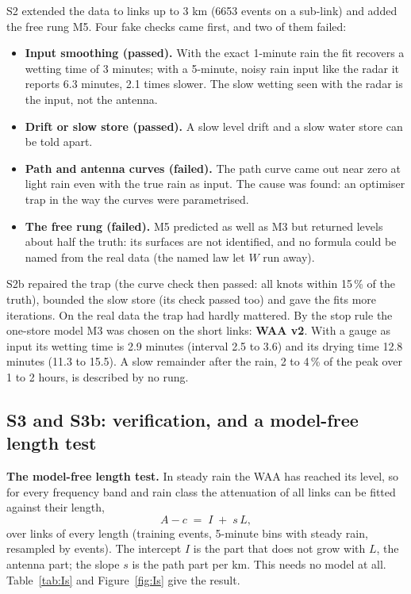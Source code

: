 \documentclass[11pt,a4paper]{article}
\begin{document}
S2 extended the data to links up to 3 km (6653 events on a sub-link) and added the free rung M5. Four fake checks
came first, and two of them failed:
\begin{itemize}
\item \textbf{Input smoothing (passed).} With the exact 1-minute rain the fit recovers a wetting time of 3 minutes;
with a 5-minute, noisy rain input like the radar it reports 6.3 minutes, 2.1 times slower. The slow wetting seen with
the radar is the input, not the antenna.
\item \textbf{Drift or slow store (passed).} A slow level drift and a slow water store can be told apart.
\item \textbf{Path and antenna curves (failed).} The path curve came out near zero at light rain even with the true
rain as input. The cause was found: an optimiser trap in the way the curves were parametrised.
\item \textbf{The free rung (failed).} M5 predicted as well as M3 but returned levels about half the truth: its
surfaces are not identified, and no formula could be named from the real data (the named law let $W$ run away).
\end{itemize}
S2b repaired the trap (the curve check then passed: all knots within 15\,\% of the truth), bounded the slow store
(its check passed too) and gave the fits more iterations. On the real data the trap had hardly mattered. By the stop
rule the one-store model M3 was chosen on the short links: \textbf{WAA v2}. With a gauge as input its wetting time is
2.9 minutes (interval 2.5 to 3.6) and its drying time 12.8 minutes (11.3 to 15.5). A slow remainder after the rain,
2 to 4\,\% of the peak over 1 to 2 hours, is described by no rung.

\subsection{S3 and S3b: verification, and a model-free length test}
\label{sec:s3}

\textbf{The model-free length test.} In steady rain the WAA has reached its level, so for every frequency band and
rain class the attenuation of all links can be fitted against their length,
\begin{equation}
A - c \;=\; I \;+\; s\,L ,
\label{eq:Is}
\end{equation}
over links of every length (training events, 5-minute bins with steady rain, resampled by events). The intercept $I$
is the part that does not grow with $L$, the antenna part; the slope $s$ is the path part per km. This needs no model
at all. Table~\ref{tab:Is} and Figure~\ref{fig:Is} give the result.
\end{document}
